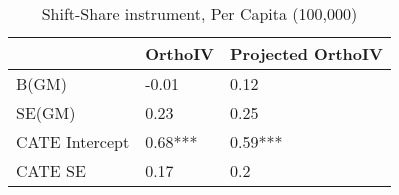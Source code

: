 \begin{table}\centering\caption{Shift-Share instrument, Per Capita (100,000)}\begin{tabular}{lll}
\toprule
                & OrthoIV   & Projected OrthoIV   \\
\midrule
 B(GM)          & -0.01     & 0.12                \\
 SE(GM)         & 0.23      & 0.25                \\
 CATE Intercept & 0.68***   & 0.59***             \\
 CATE SE        & 0.17      & 0.2                 \\
\bottomrule
\end{tabular}\end{table}